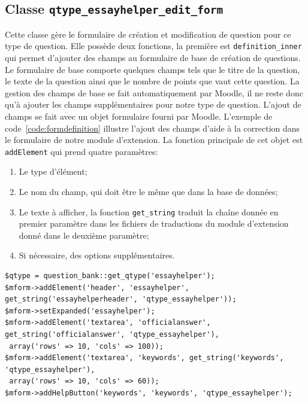 \subsection*{Classe \texttt{qtype\_essayhelper\_edit\_form}}
Cette classe g\`ere le formulaire de cr\'eation et modification de question pour ce type de question.
Elle poss\`ede deux fonctions, la premi\`ere est \texttt{definition\_inner} qui permet d'ajouter des champs au formulaire de base de cr\'eation de questions.
Le formulaire de base comporte quelques champs tels que le titre de la question, le texte de la question ainsi que le nombre de points que vaut cette question.
La gestion des champs de base se fait automatiquement par Moodle, il ne reste donc qu'\`a ajouter les champs suppl\'ementaires pour notre type de question.
L'ajout de champs se fait avec un objet formulaire fourni par Moodle.
L'exemple de code~\ref{code:formdefinition} illustre l'ajout des champs d'aide \`a la correction dans le formulaire de notre module d'extension.
La fonction principale de cet objet est \texttt{addElement} qui prend quatre param\`etres:
\begin{enumerate}
  \item Le type d'\'el\'ement;
  \item Le nom du champ, qui doit \^etre le m\^eme que dans la base de donn\'ees;
  \item Le texte \`a afficher, la fonction \texttt{get\_string} traduit la cha\^ine donn\'ee en premier param\`etre dans les fichiers de traductions du module d'extension donn\'e dans le deuxi\`eme param\`etre;
  \item Si n\'ecessaire, des options suppl\'ementaires.
\end{enumerate}

\begin{lstfloat}
\begin{lstlisting}[frame=l]
$qtype = question_bank::get_qtype('essayhelper');
$mform->addElement('header', 'essayhelper', get_string('essayhelperheader', 'qtype_essayhelper'));
$mform->setExpanded('essayhelper');
$mform->addElement('textarea', 'officialanswer', get_string('officialanswer', 'qtype_essayhelper'),
 array('rows' => 10, 'cols' => 100));
$mform->addElement('textarea', 'keywords', get_string('keywords', 'qtype_essayhelper'),
 array('rows' => 10, 'cols' => 60));
$mform->addHelpButton('keywords', 'keywords', 'qtype_essayhelper');
\end{lstlisting}
\caption{Extrait du code de la fonction \texttt{definition\_inner} de la classe \texttt{qtype\_essayhelper\_edit\_form}.}
\label{code:formdefinition}
\end{lstfloat}

